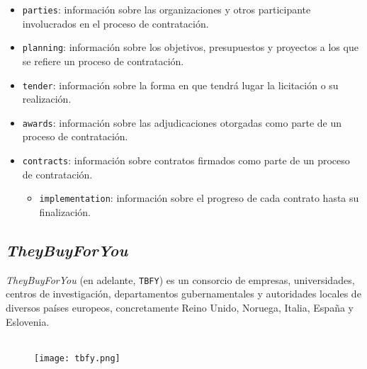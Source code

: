             \begin{itemize}
                \item \texttt{parties}: información sobre las organizaciones y otros participante involucrados en el proceso de contratación.
                \item \texttt{planning}: información sobre los objetivos, presupuestos y proyectos a los que se refiere un proceso de contratación.
                \item \texttt{tender}: información sobre la forma en que tendrá lugar la licitación o su realización.
                \item \texttt{awards}: información sobre las adjudicaciones otorgadas como parte de un proceso de contratación.
                \item \texttt{contracts}: información sobre contratos firmados como parte de un proceso de contratación.
                \begin{itemize}
                    \item \texttt{implementation}: información sobre el progreso de cada contrato hasta su finalización.
                \end{itemize}
            \end{itemize}
            
    \subsection{\textit{TheyBuyForYou}}
        \textit{TheyBuyForYou} (en adelante, \texttt{TBFY}) es un consorcio de empresas, universidades, centros de investigación, departamentos gubernamentales y autoridades locales de diversos países europeos, concretamente Reino Unido, Noruega, Italia, España y Eslovenia.
        \\ \\
        
        \begin{figure}[h]
            \centering
            \texttt{[image: tbfy.png]}
        \end{figure}
        
